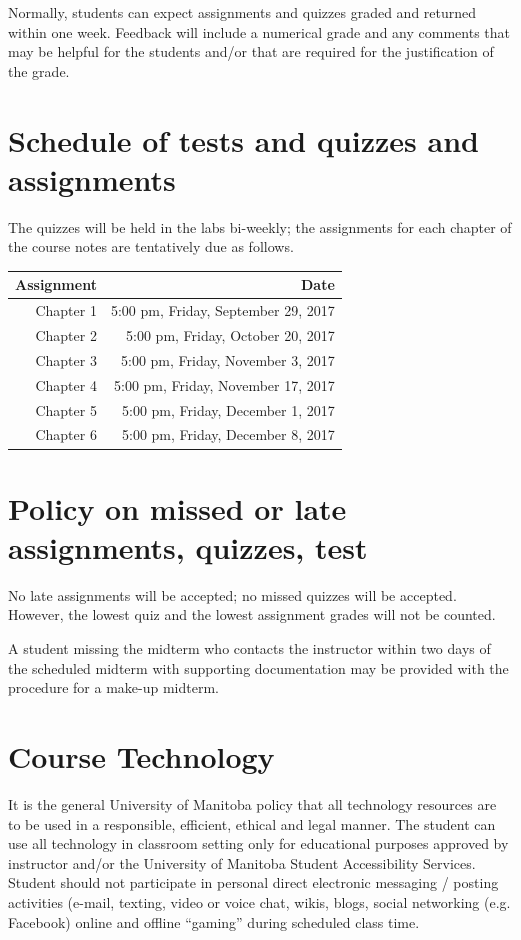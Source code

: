 \documentclass[12pt]{article}
\begin{document}
Normally, students can expect assignments and quizzes graded and returned within one week. Feedback will include a numerical grade and any comments that may be helpful for the students and/or that are required for the justification of the grade.

\section{Schedule of tests and quizzes and assignments}

The quizzes will be held in the labs bi-weekly; the assignments for each chapter of the course notes are tentatively due as follows.

\begin{center}
\begin{tabular}[t]{rr}
\toprule
\textbf{Assignment} & \textbf{Date}\\
\midrule
Chapter 1 & 5:00 pm, Friday, September 29, 2017\\
Chapter 2 & 5:00 pm, Friday, October 20, 2017\\
Chapter 3 & 5:00 pm, Friday, November 3, 2017\\
Chapter 4 & 5:00 pm, Friday, November 17, 2017\\
Chapter 5 & 5:00 pm, Friday, December 1, 2017\\
Chapter 6 & 5:00 pm, Friday, December 8, 2017\\
\bottomrule
\end{tabular}
\end{center}

\section{Policy on missed or late assignments, quizzes, test}

No late assignments will be accepted; no missed quizzes will be accepted. However, the lowest quiz and the lowest assignment grades will not be counted.

A student missing the midterm who contacts the instructor within two days of the scheduled midterm with supporting documentation may be provided with the procedure for a make-up midterm.

\section{Course Technology}

It is the general University of Manitoba policy that all technology resources are to be used in a responsible, efficient, ethical and legal manner. The student can use all technology in classroom setting only for educational purposes approved by instructor and/or the University of Manitoba Student Accessibility Services. Student should not participate in personal direct electronic messaging / posting activities (e-mail, texting, video or voice chat, wikis, blogs, social networking (e.g. Facebook) online and offline ``gaming'' during scheduled class time.
\end{document}
